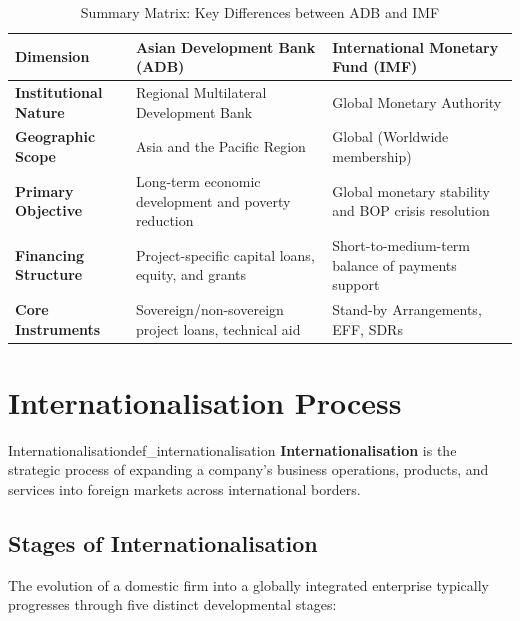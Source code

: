 \begin{table}[htbp]
    \centering
    \small
    \renewcommand{\arraystretch}{1.25}
    \begin{tabularx}{\textwidth}{lXX}
        \toprule
        \textbf{Dimension} & \textbf{Asian Development Bank (ADB)} & \textbf{International Monetary Fund (IMF)} \\
        \midrule
        \textbf{Institutional Nature} & Regional Multilateral Development Bank & Global Monetary Authority \\
        \textbf{Geographic Scope} & Asia and the Pacific Region & Global (Worldwide membership) \\
        \textbf{Primary Objective} & Long-term economic development and poverty reduction & Global monetary stability and BOP crisis resolution \\
        \textbf{Financing Structure} & Project-specific capital loans, equity, and grants & Short-to-medium-term balance of payments support \\
        \textbf{Core Instruments} & Sovereign/non-sovereign project loans, technical aid & Stand-by Arrangements, EFF, SDRs \\
        \bottomrule
    \end{tabularx}
    \caption{Summary Matrix: Key Differences between ADB and IMF}
    \label{tab:adb_imf_matrix}
\end{table}

\newpage
\section{Internationalisation Process}

\begin{definition}{Internationalisation}{def_internationalisation}
\textbf{Internationalisation} is the strategic process of expanding a company's business operations, products, and services into foreign markets across international borders.
\end{definition}

\subsection{Stages of Internationalisation}
The evolution of a domestic firm into a globally integrated enterprise typically progresses through five distinct developmental stages:

